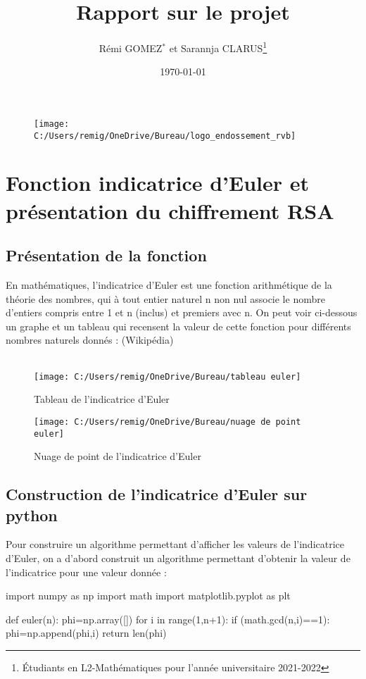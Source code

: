 \documentclass[12pt]{article}
\begin{document}
\title{\bf Rapport sur le projet}
\author{Rémi GOMEZ${}^\ast$ et Sarannja CLARUS\footnote{\'Etudiants en L2-Mathématiques pour l'année universitaire 2021-2022}}
\date{\today}
\maketitle


\begin{figure}[h]
	\texttt{[image: C:/Users/remig/OneDrive/Bureau/logo\_endossement\_rvb]}
	\centering
\end{figure}
\tableofcontents



\newpage


\section{Fonction indicatrice d'Euler et présentation du chiffrement RSA}
\subsection{Présentation de la fonction}
En mathématiques, l'indicatrice d'Euler est une fonction arithmétique de la théorie des nombres, qui à tout entier naturel n non nul associe le nombre d'entiers compris entre 1 et n (inclus) et premiers avec n.
On peut voir ci-dessous un graphe et un tableau qui recensent la valeur de cette fonction pour différents nombres naturels donnés : (Wikipédia)
\\
\\
\begin{figure}[h]
    \begin{minipage}[c]{.46\linewidth}
        \centering
        \texttt{[image: C:/Users/remig/OneDrive/Bureau/tableau euler]}
        \caption{Tableau de l'indicatrice d'Euler}
    \end{minipage}
    \hfill%
    \begin{minipage}[c]{.46\linewidth}
        \centering
        \texttt{[image: C:/Users/remig/OneDrive/Bureau/nuage de point euler]}
        \caption{Nuage de point de l'indicatrice d'Euler}
    \end{minipage}
\end{figure}
\newpage
\subsection{Construction de l'indicatrice d'Euler sur python}
Pour construire un algorithme permettant d'afficher les valeurs de l'indicatrice d'Euler, on a d'abord construit un algorithme permettant d'obtenir la valeur de l'indicatrice pour une valeur donnée :
\begin{python}
import numpy as np
import math
import matplotlib.pyplot as plt

def euler(n):
    phi=np.array([])
    for i in range(1,n+1):
        if (math.gcd(n,i)==1):
            phi=np.append(phi,i)
    return len(phi)
\end{python}
\end{document}
